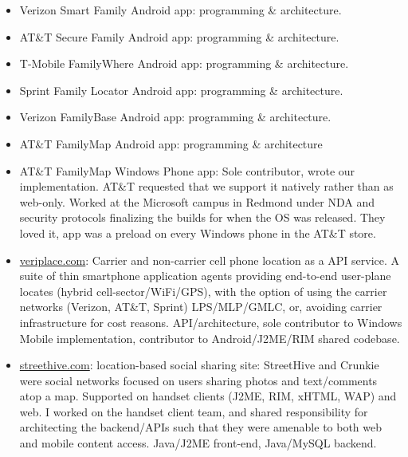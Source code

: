 	   \begin{itemize}
		\item Verizon Smart Family Android app: programming \& architecture. \\[-16pt]
		\item AT\&T Secure Family Android app: programming \& architecture.  \\[-16pt]
		\item T-Mobile FamilyWhere Android app: programming \& architecture.  \\[-16pt]
		\item Sprint Family Locator Android app: programming \& architecture.   \\[-16pt]

		\item Verizon FamilyBase Android app: programming \& architecture.   \\[-16pt]
		\item AT\&T FamilyMap Android app: programming \& architecture  \\[-16pt]
		\item AT\&T FamilyMap Windows Phone app: Sole contributor, wrote our 
			implementation. AT\&T requested that we support it natively rather than as web-only. 
			Worked at the Microsoft campus in Redmond under NDA and security protocols
			finalizing the builds for when the OS was released.
			They loved it, app was a preload on every Windows phone in the AT\&T store. \\[-16pt]

		\item \url{veriplace.com}: Carrier and non-carrier cell phone location as a API service. 
		A suite of thin smartphone application agents providing
		end-to-end user-plane locates (hybrid cell-sector/WiFi/GPS), with the option of using the 
		carrier networks (Verizon, AT\&T, Sprint) LPS/MLP/GMLC, or, avoiding carrier infrastructure for cost reasons.
		API/architecture, sole contributor to Windows Mobile implementation, contributor to Android/J2ME/RIM
		shared codebase.

		\item \url{streethive.com}: location-based social sharing site: StreetHive and Crunkie were social networks 
		focused on users sharing photos and text/comments atop a map. Supported on 
		handset clients (J2ME, RIM, xHTML, WAP) and web.  
		I worked on the handset client team, and shared responsibility for architecting the backend/APIs such that
		they were amenable to both web and 
		mobile content access. Java/J2ME front-end, Java/MySQL backend.


\end{itemize}
